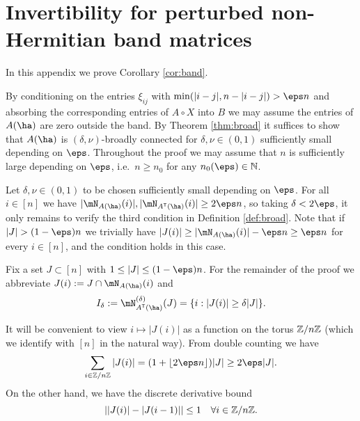 \documentclass[aop,preprint]{imsart}
\theoremstyle{plain}
\theoremstyle{definition}
\theoremstyle{remark}
\numberwithin{equation}{section}
\numberwithin{theorem}{section}
\def \lf {\lfloor}
\def \rf {\rfloor}
\def \tran {\mathsf{T}}
\begin{document}
\appendix


\section{Invertibility for perturbed non-Hermitian band matrices}	\label{app:band}

In this appendix we prove Corollary \ref{cor:band}.

By conditioning on the entries $\xi_{ij}$ with $\min(|i-j|,n-|i-j|)> \eps n$ and absorbing the corresponding entries of $A\circ X$ into $B$ we may assume the entries of $A(\ha)$ are zero outside the band.
By Theorem \ref{thm:broad} it suffices to show that $A(\ha)$ is $(\delta,\nu)$-broadly connected for $\delta,\nu\in (0,1)$ sufficiently small depending on $\eps$. 
Throughout the proof we may assume that $n$ is sufficiently large depending on $\eps$, i.e.\ $n\ge n_0$ for any $n_0(\eps)\in \N$.

Let $\delta,\nu\in (0,1)$ to be chosen sufficiently small depending on $\eps$. 
For all $i\in [n]$ we have $|\mN_{A(\ha)}(i)|,|\mN_{A^\tran(\ha)}(i)|\ge 2\eps n$, so taking $\delta<2\eps$, it only remains to verify the third condition in Definition \ref{def:broad}.
Note that if $|J|>(1-\eps)n$ we trivially have $|J(i)| \ge |\mN_{A(\ha)}(i)| - \eps n \ge \eps n$ for every $i\in [n]$, and the condition holds in this case.

Fix a set $J\subset[n]$ with $1\le |J|\le (1-\eps)n$. For the remainder of the proof we abbreviate $J(i):= J\cap \mN_{A(\ha)}(i)$ and 
\[
I_\delta:= \mN_{A^\tran(\ha)}^{(\delta)}(J) = \{i: |J(i)| \ge \delta |J|\}.
\]

It will be convenient to view $i\mapsto |J(i)|$ as a function on the torus ${\mathbb Z}/n{\mathbb Z}$ (which we identify with $[n]$ in the natural way). From double counting we have
\begin{equation}	\label{ex:doublect}
\sum_{i\in \Z/n\Z} |J(i)| = (1+\lf 2\eps n\rf)|J| \ge 2\eps |J|.
\end{equation}
On the other hand, we have the discrete derivative bound
\begin{equation}	\label{discderiv}
||J(i)|-|J(i-1)||\le 1	\quad \forall i\in \Z/n\Z.
\end{equation}
\end{document}
